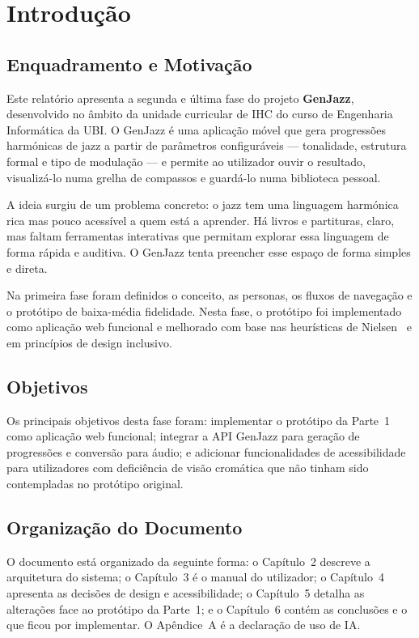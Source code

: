 \chapter{Introdução}
\label{chap:intro}

\section{Enquadramento e Motivação}
\label{sec:enquadramento}

Este relatório apresenta a segunda e última fase do projeto \textbf{GenJazz}, desenvolvido no âmbito da unidade curricular de \ac{IHC} do curso de Engenharia Informática da \ac{UBI}. O GenJazz é uma aplicação móvel que gera progressões harmónicas de jazz a partir de parâmetros configuráveis --- tonalidade, estrutura formal e tipo de modulação --- e permite ao utilizador ouvir o resultado, visualizá-lo numa grelha de compassos e guardá-lo numa biblioteca pessoal.

A ideia surgiu de um problema concreto: o jazz tem uma linguagem harmónica rica mas pouco acessível a quem está a aprender. Há livros e partituras, claro, mas faltam ferramentas interativas que permitam explorar essa linguagem de forma rápida e auditiva. O GenJazz tenta preencher esse espaço de forma simples e direta.

Na primeira fase foram definidos o conceito, as personas, os fluxos de navegação e o protótipo de baixa-média fidelidade. Nesta fase, o protótipo foi implementado como aplicação web funcional e melhorado com base nas heurísticas de Nielsen~\cite{nielsen1994} e em princípios de design inclusivo.

\section{Objetivos}
\label{sec:objetivos}

Os principais objetivos desta fase foram: implementar o protótipo da Parte~1 como aplicação web funcional; integrar a API GenJazz para geração de progressões e conversão para áudio; e adicionar funcionalidades de acessibilidade para utilizadores com deficiência de visão cromática que não tinham sido contempladas no protótipo original.

\section{Organização do Documento}
\label{sec:organizacao}

O documento está organizado da seguinte forma: o Capítulo~2 descreve a arquitetura do sistema; o Capítulo~3 é o manual do utilizador; o Capítulo~4 apresenta as decisões de design e acessibilidade; o Capítulo~5 detalha as alterações face ao protótipo da Parte~1; e o Capítulo~6 contém as conclusões e o que ficou por implementar. O Apêndice~A é a declaração de uso de IA.
